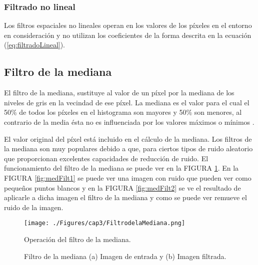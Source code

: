 \subsubsection{Filtrado no lineal}
Los filtros espaciales no lineales operan en los valores de los píxeles en el entorno en consideración y no utilizan los coeficientes de la forma descrita en la ecuación (\ref{eq:filtradoLineal}).


\subsection{Filtro de la mediana}
El filtro de la mediana, sustituye al valor de un píxel por la mediana de los niveles de gris en la vecindad de ese píxel. La mediana es el valor para el cual el 50\% de todos los píxeles en el histograma son mayores y 50\% son menores, al contrario de la media ésta no es influenciada por los valores máximos o mínimos \cite{mehl1997fundamentos,gupta2011algorithm}.

El valor original del píxel está incluido en el cálculo de la mediana. Los filtros de la mediana son muy populares debido a que, para ciertos tipos de ruido aleatorio que proporcionan excelentes capacidades de reducción de ruido. El funcionamiento del filtro de la mediana se puede ver en la FIGURA \ref{fig:FiltroDeLaMediana}. En la FIGURA \ref{fig:medFilt1} se puede ver una imagen con ruido que pueden ver como pequeños puntos blancos y en la FIGURA \ref{fig:medFilt2} se ve el resultado de aplicarle a dicha imagen el filtro de la mediana y como se puede ver remueve el ruido de la imagen.



\begin{figure}[H]
	\centering
		\texttt{[image: ./Figures/cap3/FiltrodelaMediana.png]}
	\caption{Operación del filtro de la mediana.}
	\label{fig:FiltroDeLaMediana}
\end{figure}



  \begin{figure}[H]
	\centering
	\caption{Filtro de la mediana (a) Imagen de entrada y (b) Imagen filtrada.}
	\label{fig:medFilt}
\end{figure}




